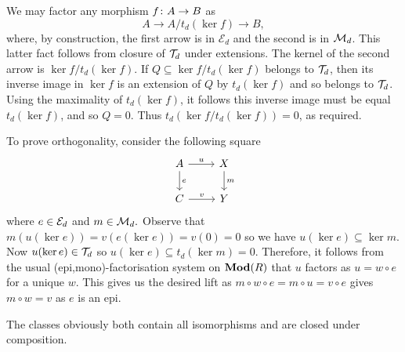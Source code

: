 \documentclass[runningheads]{llncs}
\begin{document}
\begin{proofE}
We may factor any morphism $f\colon A \to B$ as
\begin{equation*}
  A \longrightarrow A/t_d(\ker f) \longrightarrow B,
\end{equation*}
where, by construction, the first arrow is in $\mathcal E_d$ and the second is in $\mathcal{M}_d$.
This latter fact follows from closure of $\mathcal T_d$ under extensions.
The kernel of the second arrow is $\ker f / t_d(\ker f)$.
If $Q \subseteq \ker f / t_d(\ker f)$ belongs to $\mathcal T_d$, then its inverse image in $\ker f$ is an extension of $Q$ by $t_d(\ker f)$ and so belongs to $\mathcal T_d$.
Using the maximality of $t_d(\ker f)$, it follows this inverse image must be equal $t_d(\ker f)$, and so $Q = 0$.
Thus $t_d(\ker f / t_d(\ker f)) = 0$, as required.

 To prove orthogonality, consider the following square
 \begin{equation*}
 \begin{tikzcd}
 A \rar{u} \dar{e} & X \dar{m}
 \\
 C \rar{v} & Y
 \end{tikzcd}
 \end{equation*}
 where $e\in \mathcal{E}_d$ and $m \in \mathcal{M}_d.$
Observe that  $m(u(\ker e)) = v(e(\ker e)) = v(0) = 0$ so we have $u(\ker e) \subseteq \ker m$.  Now $u(\ker e)\in \mathcal T_d$  so $u(\ker e) \subseteq t_d(\ker m) = 0$. Therefore, it follows from the usual (epi,mono)-factorisation system on $\operatorname{\mathbf{Mod}}(R)$ that $u$ factors as $u = w\circ e$ for a unique $w$. This gives us the desired lift as $m\circ w \circ e = m \circ u = v\circ e$ gives $m \circ  w = v$ as $e$ is an epi.

The classes obviously both contain all isomorphisms and are closed under composition.
\end{proofE}
\end{document}

